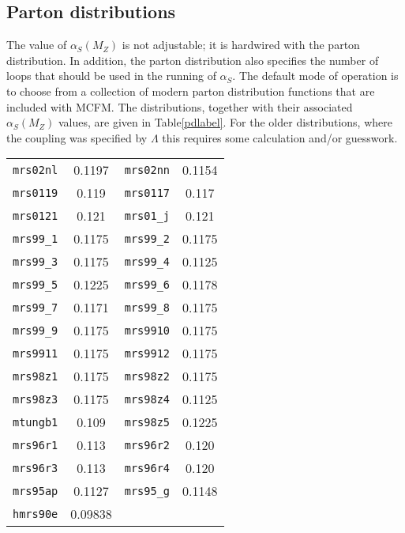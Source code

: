 \documentclass[12pt]{article}
\begin{document}
\subsection{Parton distributions}
The value of $\alpha_S(M_Z)$ is not adjustable; it is hardwired with the
parton distribution. In addition, the parton distribution also specifies
the number of loops that should be used in the running of $\alpha_S$.
The default mode of operation is to choose from a
collection of modern parton distribution functions that are included with
MCFM.  The distributions, together with their associated $\alpha_S(M_Z)$
values, are given in Table\ref{pdlabel}. 
For the older distributions, where the
coupling was specified by $\Lambda$ this requires 
some calculation and/or guesswork.
\begin{table}[h]
\begin{center}
\begin{tabular}{|c|c||c|c|}
\hline
{\tt mrs02nl}  & 0.1197       &
{\tt mrs02nn}  & 0.1154       \\
{\tt mrs0119}  & 0.119        &
{\tt mrs0117}  & 0.117        \\
{\tt mrs0121}  & 0.121        &
{\tt mrs01\_j} & 0.121        \\
{\tt mrs99\_1} & 0.1175       &
{\tt mrs99\_2} & 0.1175       \\
{\tt mrs99\_3} & 0.1175       &
{\tt mrs99\_4} & 0.1125       \\    
{\tt mrs99\_5} & 0.1225       &
{\tt mrs99\_6} & 0.1178       \\    
{\tt mrs99\_7} & 0.1171       &
{\tt mrs99\_8} & 0.1175       \\    
{\tt mrs99\_9} & 0.1175       &
{\tt mrs9910}  & 0.1175       \\    
{\tt mrs9911}  & 0.1175       &
{\tt mrs9912}  & 0.1175       \\    
{\tt mrs98z1}  &  0.1175      &   
{\tt mrs98z2}  &  0.1175      \\ 
{\tt mrs98z3}  &  0.1175      &  
{\tt mrs98z4}  &  0.1125      \\  
{\tt mtungb1}  &  0.109       &
{\tt mrs98z5}  &  0.1225      \\   
{\tt mrs96r1}  &  0.113       &    
{\tt mrs96r2}  &  0.120       \\  
{\tt mrs96r3}  &  0.113       &   
{\tt mrs96r4}  &  0.120       \\   
{\tt mrs95ap}  &  0.1127      & 
{\tt mrs95\_g} &  0.1148      \\
{\tt hmrs90e}  &  0.09838     & 

\end{tabular}
\end{center}
\end{table}
\end{document}

